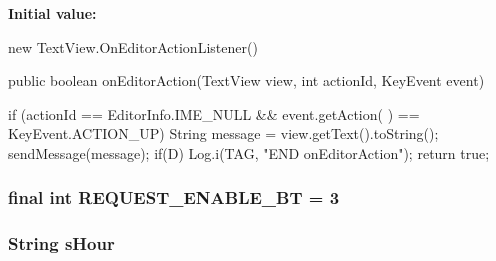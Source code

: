 {\bfseries Initial value\-:}
\begin{DoxyCode}

                        new TextView.OnEditorActionListener() {
                public boolean onEditorAction(TextView view, int actionId, 
      KeyEvent event) {
                        
                        if (actionId == EditorInfo.IME_NULL && event.getAction(
      ) == KeyEvent.ACTION_UP) {
                                String message = view.getText().toString();
                                sendMessage(message);
                        }
                        if(D) Log.i(TAG, "END onEditorAction");
                        return true;
                }
        }
\end{DoxyCode}
\hypertarget{classcom_1_1example_1_1android_1_1_bluetooth_chat_1_1_l_a_s_a_r_control_a97c8da628747620e0882fcec5b6cee15}{
\subsubsection[{R\-E\-Q\-U\-E\-S\-T\-\_\-\-E\-N\-A\-B\-L\-E\-\_\-\-B\-T}]{\setlength{\rightskip}{0pt plus 5cm}final int {\bf R\-E\-Q\-U\-E\-S\-T\-\_\-\-E\-N\-A\-B\-L\-E\-\_\-\-B\-T} = 3}}\label{classcom_1_1example_1_1android_1_1_bluetooth_chat_1_1_l_a_s_a_r_control_a97c8da628747620e0882fcec5b6cee15}
\hypertarget{classcom_1_1example_1_1android_1_1_bluetooth_chat_1_1_l_a_s_a_r_control_a5524f6769a80d9b5e77ec542cc7dc853}{
\subsubsection[{s\-Hour}]{\setlength{\rightskip}{0pt plus 5cm}String {\bf s\-Hour}}}\label{classcom_1_1example_1_1android_1_1_bluetooth_chat_1_1_l_a_s_a_r_control_a5524f6769a80d9b5e77ec542cc7dc853}
